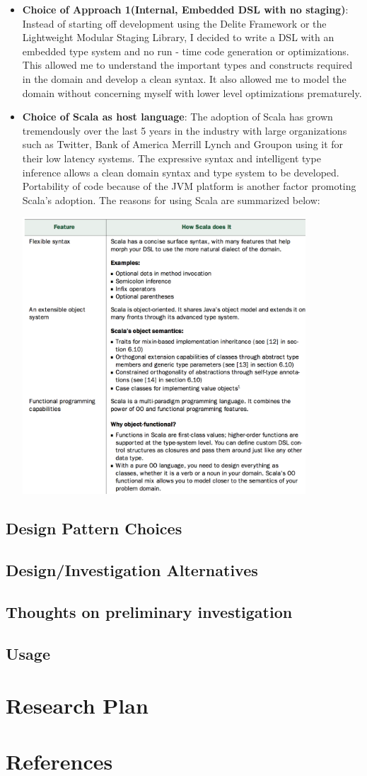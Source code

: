 \documentclass[12 pt]{article}
\begin{document}
\begin{itemize}
\item \textbf{Choice of Approach 1(Internal, Embedded DSL with no staging)}: Instead of starting off development using the Delite Framework or the Lightweight Modular Staging Library, I decided to write a DSL with an embedded type system and no run - time code generation or optimizations. This allowed me to understand the important types and constructs required in the domain and develop a clean syntax. It also allowed me to model the domain without concerning myself with lower level optimizations prematurely.
\item \textbf{Choice of Scala as host language}: The adoption of Scala has grown tremendously over the last 5 years in the industry with large organizations such as Twitter, Bank of America Merrill Lynch and Groupon using it for their low latency systems. The expressive syntax and intelligent type inference allows a clean domain syntax and type system to be developed. Portability of code because of the JVM platform is another factor promoting Scala's adoption. The reasons for using Scala are summarized below:
\begin{center}
    \includegraphics[width=400px]{figures/scala_motivation.png}
\end{center}

\end{itemize}
\subsection{Design Pattern Choices}
\subsection{Design/Investigation Alternatives}
\subsection{Thoughts on preliminary investigation}
\subsection{Usage}
\newpage
\section{Research Plan}
\newpage
\section{References}
\end{document}
